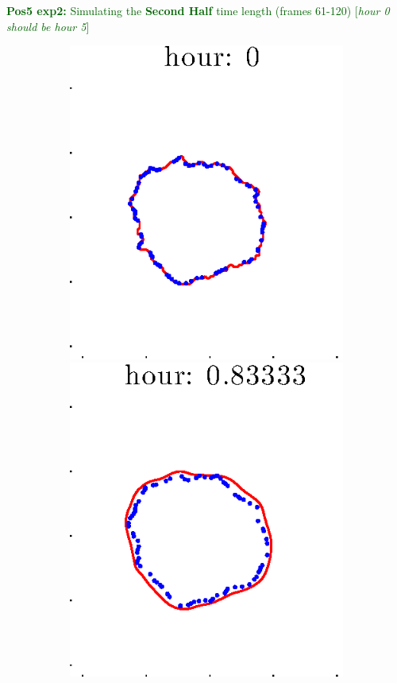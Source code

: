 \documentclass[12pt]{article}
\begin{document}
\clearpage

\noindent \textcolor{DarkGreen}{\textbf{Pos5 exp2:} Simulating the \textbf{Second Half} time length (frames 61-120) [\textit{hour 0 should be hour 5}]}

\begin{figure}[h!]
\centering
	\begin{subfigure}[b]{.3\textwidth}
	\centering
		\includegraphics[height=.15\textheight]{Pos5exp2/secondhalf/full1.eps}
		\includegraphics[height=.15\textheight]{Pos5exp2/secondhalf/full2.eps}

\end{subfigure}
\end{figure}
\end{document}

